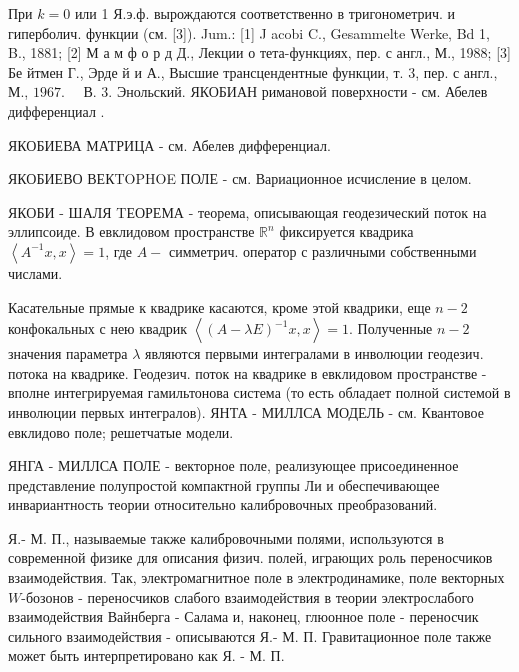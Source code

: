 \documentclass[10pt]{article}
\begin{document}
При $k=0$ или 1 Я.э.ф. вырождаются соответственно в тригонометрич. и гиперболич. функции (см. [3]). Jum.: [1] J acobi C., Gesammelte Werke, Bd 1, B., 1881; [2] М а м ф о р д Д., Лекции о тета-функциях, пер. с англ., М., 1988; [3] Бе йтмен Г., Эрде й и А., Высшие трансцендентные функции, т. 3, пер. с англ., М., $1967 . \quad$ В. 3. Энольский. ЯКОБИАН римановой поверхности - см. Абелев дифференциал .



ЯКОБИЕВА МАТРИЦА - см. Абелев дифференциал.



ЯКОБИЕВО ВЕКTOPHOE ПОЛЕ - см. Вариационное исчисление в целом.



ЯКОБИ - ШАЛЯ TЕОРЕМА - теорема, описывающая геодезический поток на эллипсоиде. В евклидовом пространстве $\mathbb{R}^{n}$ фиксируется квадрика $\left\langle A^{-1} x, x\right\rangle=1$, где $A-$ симметрич. оператор с различными собственными числами.



Касательные прямые к квадрике касаются, кроме этой квадрики, еще $n-2$ конфокальных с нею квадрик $\left\langle(A-\lambda E)^{-1} x, x\right\rangle=1$. Полученные $n-2$ значения параметра $\lambda$ являются первыми интегралами в инволюции геодезич. потока на квадрике. Геодезич. поток на квадрике в евклидовом пространстве - вполне интегрируемая гамильтонова система (то есть обладает полной системой в инволюции первых интегралов). ЯНТА - МИЛЛСА МОДЕЛЬ - см. Квантовое евклидово поле; решетчатые модели.



ЯНГА - МИЛЛСА ПОЛЕ - векторное поле, реализующее присоединенное представление полупростой компактной группы Ли и обеспечивающее инвариантность теории относительно калибровочных преобразований.



Я.- М. П., называемые также калибровочными полями, используются в современной физике для описания физич. полей, играющих роль переносчиков взаимодействия. Так, электромагнитное поле в электродинамике, поле векторных $W$-бозонов - переносчиков слабого взаимодействия в теории электрослабого взаимодействия Вайнберга - Салама и, наконец, глюонное поле - переносчик сильного взаимодействия - описываются Я.- М. П. Гравитационное поле также может быть интерпретировано как Я. - М. П.
\end{document}

